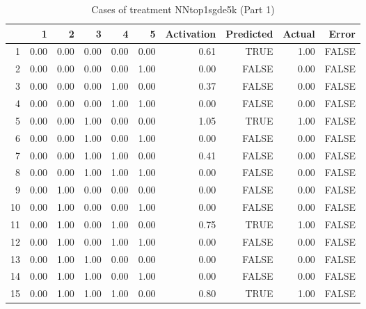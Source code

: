 \begin{table}[ht]
\centering
\begin{tabular}{rrrrrrrrrr}
  \hline
 & 1 & 2 & 3 & 4 & 5 & Activation & Predicted & Actual & Error \\ 
  \hline
1 & 0.00 & 0.00 & 0.00 & 0.00 & 0.00 & 0.61 & TRUE & 1.00 & FALSE \\ 
  2 & 0.00 & 0.00 & 0.00 & 0.00 & 1.00 & 0.00 & FALSE & 0.00 & FALSE \\ 
  3 & 0.00 & 0.00 & 0.00 & 1.00 & 0.00 & 0.37 & FALSE & 0.00 & FALSE \\ 
  4 & 0.00 & 0.00 & 0.00 & 1.00 & 1.00 & 0.00 & FALSE & 0.00 & FALSE \\ 
  5 & 0.00 & 0.00 & 1.00 & 0.00 & 0.00 & 1.05 & TRUE & 1.00 & FALSE \\ 
  6 & 0.00 & 0.00 & 1.00 & 0.00 & 1.00 & 0.00 & FALSE & 0.00 & FALSE \\ 
  7 & 0.00 & 0.00 & 1.00 & 1.00 & 0.00 & 0.41 & FALSE & 0.00 & FALSE \\ 
  8 & 0.00 & 0.00 & 1.00 & 1.00 & 1.00 & 0.00 & FALSE & 0.00 & FALSE \\ 
  9 & 0.00 & 1.00 & 0.00 & 0.00 & 0.00 & 0.00 & FALSE & 0.00 & FALSE \\ 
  10 & 0.00 & 1.00 & 0.00 & 0.00 & 1.00 & 0.00 & FALSE & 0.00 & FALSE \\ 
  11 & 0.00 & 1.00 & 0.00 & 1.00 & 0.00 & 0.75 & TRUE & 1.00 & FALSE \\ 
  12 & 0.00 & 1.00 & 0.00 & 1.00 & 1.00 & 0.00 & FALSE & 0.00 & FALSE \\ 
  13 & 0.00 & 1.00 & 1.00 & 0.00 & 0.00 & 0.00 & FALSE & 0.00 & FALSE \\ 
  14 & 0.00 & 1.00 & 1.00 & 0.00 & 1.00 & 0.00 & FALSE & 0.00 & FALSE \\ 
  15 & 0.00 & 1.00 & 1.00 & 1.00 & 0.00 & 0.80 & TRUE & 1.00 & FALSE \\ 
   \hline
\end{tabular}
\caption{Cases of treatment NNtop1sgde5k (Part 1)} 
\end{table}

